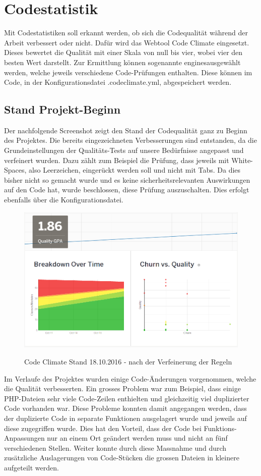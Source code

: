 \section{Codestatistik}
Mit Codestatistiken soll erkannt werden, ob sich die Codequalität während der Arbeit verbessert oder nicht. Dafür wird das Webtool Code Climate \cite{codeclimate.com} eingesetzt. Dieses bewertet die Qualität mit einer Skala von null bis vier, wobei vier den besten Wert darstellt. Zur Ermittlung können sogenannte \glqq engines\grqq ausgewählt werden, welche jeweils verschiedene Code-Prüfungen enthalten. Diese können im Code, in der Konfigurationsdatei \glqq .codeclimate.yml\grqq, abgespeichert werden.\\

\subsection{Stand Projekt-Beginn}
Der nachfolgende Screenshot zeigt den Stand der Codequalität ganz zu Beginn des Projektes. Die bereits eingezeichneten Verbesserungen sind entstanden, da die Grundeinstellungen der Qualitäts-Tests auf unsere Bedürfnisse angepasst und verfeinert wurden. Dazu zählt zum Beispiel die Prüfung, dass jeweils mit White-Spaces, also Leerzeichen, eingerückt werden soll und nicht mit Tabs. Da dies bisher nicht so gemacht wurde und es keine sicherheitsrelevanten Auswirkungen auf den Code hat, wurde beschlossen, diese Prüfung auszuschalten. Dies erfolgt ebenfalls über die Konfigurationsdatei.

\begin{figure}[H]
	\centering
	\includegraphics[width=.7\textwidth]{Images/CodeClimate_Beginn.PNG}
	\caption{Code Climate Stand 18.10.2016 - nach der Verfeinerung der Regeln}
	\cite{codeclimate.com}
\end{figure}

Im Verlaufe des Projektes wurden einige Code-Änderungen vorgenommen, welche die Qualität verbesserten. Ein grosses Problem war zum Beispiel, dass einige PHP-Dateien sehr viele Code-Zeilen enthielten und gleichzeitig viel duplizierter Code vorhanden war. Diese Probleme konnten damit angegangen werden, dass der duplizierte Code in separate Funktionen ausgelagert wurde und jeweils auf diese zugegriffen wurde. Dies hat den Vorteil, dass der Code bei Funktions-Anpassungen nur an einem Ort geändert werden muss und nicht an fünf verschiedenen Stellen. Weiter konnte durch diese Massnahme und durch zusätzliche Auslagerungen von Code-Stücken die grossen Dateien in kleinere aufgeteilt werden. \\

